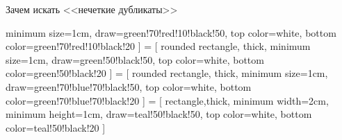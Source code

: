 \begin{frame}{Зачем искать <<нечеткие дубликаты>>}
\begin{center}
\begin{scriptsize}
                minimum size=1cm,
                draw=green!70!red!10!black!50,
                top color=white,
                bottom color=green!70!red!10!black!20
            ]
             = [
                rounded rectangle,
                thick,
                minimum size=1cm,
                draw=green!50!black!50,
                top color=white,
                bottom color=green!50!black!20
            ]
             = [
                rounded rectangle,
                thick,
                minimum size=1cm,
                draw=green!70!blue!70!black!50,
                top color=white,
                bottom color=green!70!blue!70!black!20
            ]
             = [
                rectangle,thick,
                minimum width=2cm,
                minimum height=1cm,
                draw=teal!50!black!50,
                top color=white,
                bottom color=teal!50!black!20
            ]
\end{scriptsize}
\end{center}
\end{frame}
